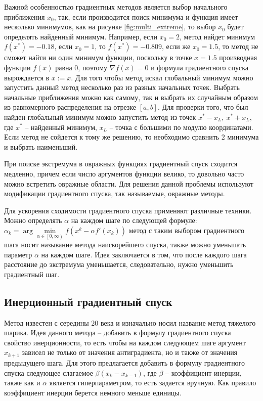 Важной особенностью градиентных методов является выбор начального приближения $x_0$, так, если производится поиск минимума и функция имеет несколько минимумов, как на рисунке \ref{fig:multi_extreme}, то выбор $x_0$ будет определять найденный минимум. Например, если $x_0 = 2$, метод найдет минимум $f(x^*) = -0.18$, если $x_0 = 1$, то $f(x^*) = -0.809$, если же $x_0 = 1.5$, то метод не сможет найти ни один минимум функции, поскольку в точке $x = 1.5$ производная функции $f(x)$ равна 0, поэтому $\nabla f(x) = 0$ и формула градиентного спуска вырождается в $x := x$. Для того чтобы метод искал глобальный минимум можно запустить данный метод несколько раз из разных начальных точек. Выбрать начальные приближения можно как самому, так и выбрать их случайным образом из равномерного распределения на отрезке $[ a, b ]$. Для проверки того, что был найден глобальный минимум можно запустить метод из точек $x^* - x_L,~x^* + x_L$, где $x^*$ -- найденный минимум, $x_L$ -- точка с большими по модулю координатами. Если метод не сойдется к тому же решению, то необходимо сравнить 2 минимума и выбрать наименьший.

При поиске экстремума в овражных функциях градиентный спуск сходится медленно, причем если число аргументов функции велико, то довольно часто можно встретить овражные области. Для решения данной проблемы используют модификации градиентного спуска, так называемые, овражные методы.

Для ускорения сходимости градиентного спуска применяют различные техники. Можно определять $\alpha$ на каждом шаге по следующей формуле: $\alpha_{k} = \arg \min\limits_{\alpha \in \left[  0, \infty \right) } f(x^k - \alpha f'(x_k))$ метод с таким выбором градиентного шага носит называние метода наискорейшего спуска, также можно уменьшать параметр $\alpha$ на каждом шаге. Идея заключается в том, что после каждого шага расстояние до экстремума уменьшается, следовательно, нужно уменьшить градиентный шаг.


\subsection{Инерционный градиентный спуск}

Метод известен с середины 20 века и изначально носил название метод тяжелого шарика. Идея данного метода -- добавить в формулу градиентного спуска свойство инерционности, то есть чтобы на каждом следующем шаге аргумент $x_{k+1}$ зависел не только от значения антиградиента, но и также от значения предыдущего шага. Для этого предлагается добавить в формулу градиентного спуска следующее слагаемое $\beta (x_k - x_{k-1})$, где $\beta$ -- коэффициент инерции, также как и $\alpha$ является гиперпараметром, то есть задается вручную. Как правило коэффициент инерции берется немного меньше единицы.

